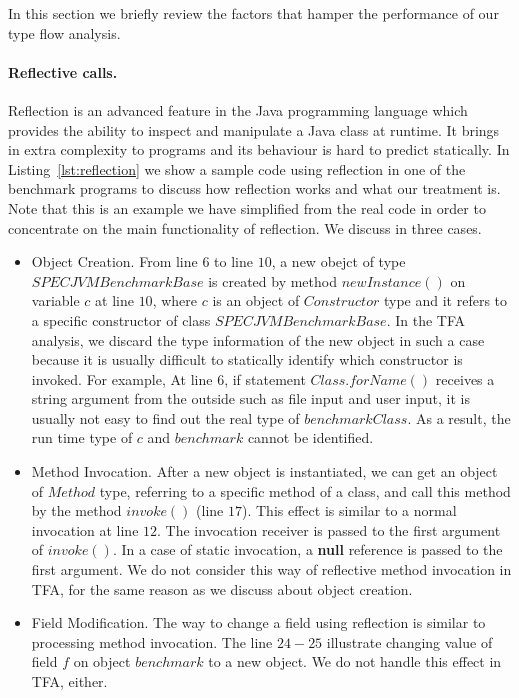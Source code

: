 \documentclass{fac}
\begin{document}
In this section we briefly review the factors that hamper the performance of our type flow analysis.

\paragraph{Reflective calls.} Reflection is an advanced feature in the Java programming language which provides the ability to inspect and manipulate a Java class at runtime. It brings in extra complexity to programs and its behaviour is hard to predict statically. In Listing~\ref{lst:reflection} we show a sample code using reflection in one of the benchmark programs to discuss how reflection works and what our treatment is. Note that this is an example we have simplified from the real code in order to concentrate on the main functionality of reflection. We discuss in three cases.
\begin{itemize}
\item Object Creation.
From line $6$ to line $10$, a new obejct of type $SPECJVMBenchmarkBase$ is created by method $newInstance()$ on variable $c$ at line $10$, where $c$ is an object of $Constructor$ type and it refers to a specific constructor of class $SPECJVMBenchmarkBase$. In the TFA analysis, we discard the type information of the new object in such a case because it is usually difficult to statically identify which constructor is invoked. For example, At line $6$, if statement $Class.forName()$ receives a string argument from the outside such as file input and user input, it is usually not easy to find out the real type of $benchmarkClass$. As a result, the run time type of $c$ and $benchmark$ cannot be identified.
\item Method Invocation.
After a new object is instantiated, we can get an object of $Method$ type, referring to a specific method of a class, and call this method by the method $invoke()$ (line $17$). This effect is similar to a normal invocation at line $12$. The invocation receiver is passed to the first argument of $invoke()$. In a case of static invocation, a \textbf{null} reference is passed to the first argument. We do not consider this way of reflective method invocation in TFA, for the same reason as we discuss about object creation.
\item Field Modification.
The way to change a field using reflection is similar to processing method invocation. The line $24-25$ illustrate changing value of field $f$ on object $benchmark$ to a new object. %
We do not handle this effect in TFA, either.
\end{itemize}
\end{document}
